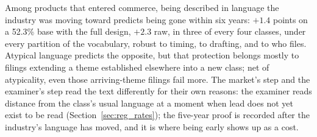 Among products that entered commerce, being described in language the
industry was moving toward predicts being gone within six years: $+1.4$
points on a 52.3\% base with the full design, $+2.3$ raw, in three of
every four classes, under every partition of the vocabulary, robust to
timing, to drafting, and to who files. Atypical language predicts the
opposite, but that protection belongs mostly to filings extending a theme
established elsewhere into a new class; net of atypicality, even those
arriving-theme filings fail more. The market's step and the examiner's
step read the text differently for their own reasons: the examiner reads
distance from the class's usual language at a moment when lead does not
yet exist to be read (Section~\ref{sec:reg_rates}); the five-year proof is
recorded after the industry's language has moved, and it is where being
early shows up as a cost.
